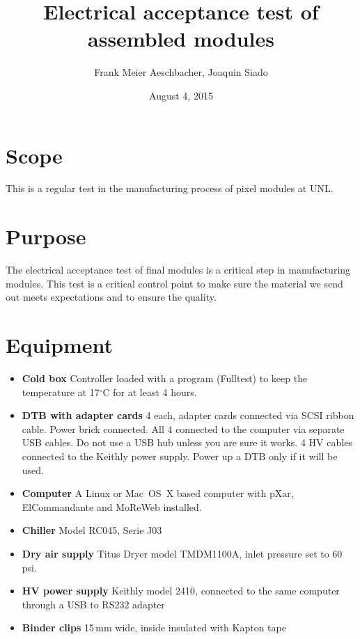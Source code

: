 \documentclass[12pt]{unlsilabsop}
\title{Electrical acceptance test of assembled modules}
\date{August 4, 2015}
\author{Frank Meier Aeschbacher, Joaquin Siado}
\begin{document}
\maketitle

\section{Scope}
This is a regular test in the manufacturing process of pixel modules at UNL.

\section{Purpose}
The electrical acceptance test of final modules is a critical step in manufacturing modules. This test is a critical control point to make sure the material we send out meets expectations and to ensure the quality.



\section{Equipment}

\begin{itemize}
\item \textbf{Cold box} Controller loaded with a program (Fulltest) to keep the temperature at 17$^\circ$C for at least 4 hours.
\item \textbf{DTB with adapter cards} 4 each, adapter cards connected via SCSI ribbon cable. Power brick connected. All 4 connected to the computer via separate USB cables. Do not use a USB hub unless you are sure it works. 4 HV cables connected to the Keithly power supply. Power up a DTB only if it will be used.
\item \textbf{Computer} A Linux or Mac~OS~X based computer with pXar, ElCommandante and MoReWeb installed.
\item \textbf{Chiller} Model RC045, Serie J03
\item \textbf{Dry air supply} Titus Dryer model TMDM1100A, inlet pressure set to 60\,psi.
\item \textbf{HV power supply} Keithly model 2410, connected to the same computer through a USB to RS232 adapter
\item \textbf{Binder clips} 15\,mm wide, inside insulated with Kapton tape
\end{itemize}
\end{document}
